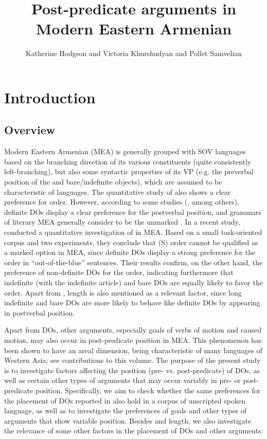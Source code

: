 \documentclass[output=paper,colorlinks,citecolor=brown,draftmode]{langscibook}
\author{Katherine Hodgson\orcid{0000-0002-1767-9262}\affiliation{University of Cambridge} and Victoria Khurshudyan\affiliation{Institut National des Langues et Civilisations Orientales (INALCO)} and Pollet Samvelian\affiliation{Université Paris III - Sorbonne Nouvelle}}
\title{Post-predicate arguments in Modern Eastern Armenian}
\begin{document}
\maketitle\label{WOWA:ch:13}

\section{Introduction}\label{Armenian:ss:1}
\subsection{Overview}
\begin{sloppypar}
Modern Eastern Armenian (MEA) is generally grouped with SOV languages based on the branching direction of its various constituents (quite consistently left-branching), but also some syntactic properties of its VP (e.g. the preverbal position of the  and bare/indefinite objects), which are assumed to be characteristic of  languages. The quantitative study of \citet{stilo_preverbal_2018} also shows a clear preference for  order. However, according to some studies (\citealt{dum-tragut_armenian_2009,badikyan_zamanakakic_1976}, among others), definite DOs display a clear preference for the postverbal position, and grammars of literary MEA generally consider  to be the unmarked . In a recent study, \citet{samvelian_persistence_2023} conducted a quantitative investigation of  in MEA. Based on a small task-oriented corpus and two experiments, they conclude that (S) order cannot be qualified as a marked option in MEA, since definite DOs display a strong preference for the  order in “out-of-the-blue” sentences. Their results confirm, on the other hand, the preference of non-definite DOs for the  order, indicating furthermore that indefinite (with the indefinite article) and bare DOs are equally likely to favor the  order. Apart from , length is also mentioned as a relevant factor, since long indefinite and bare DOs are more likely to behave like definite DOs by appearing in postverbal position.
\end{sloppypar}

Apart from DOs, other arguments, especially goals of verbs of motion and caused motion, may also occur in post-predicate position in MEA. This phenomenon has been shown to have an areal dimension, being characteristic of many languages of Western Asia; see contributions to this volume. The purpose of the present study is to investigate factors affecting the position (pre- vs. post-predicate) of DOs, as well as certain other types of arguments that may occur variably in pre- or post-predicate position. Specifically, we aim to check whether the same  preferences for the placement of DOs reported in \citet{samvelian_persistence_2023} also hold in a corpus of unscripted spoken language,  as well as to investigate the  preferences of goals and other types of arguments that show variable position. Besides  and length, we also investigate the relevance of some other factors in the placement of DOs and other arguments:
\end{document}

